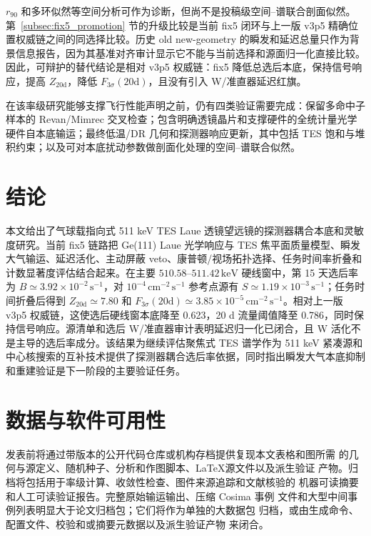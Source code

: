 \documentclass[preprint,12pt]{elsarticle}
\newcommand{\keV}{\,\mathrm{keV}}
\newcommand{\cms}{\,\mathrm{cm^{-2}\,s^{-1}}}
\newcommand{\cps}{\,\mathrm{s^{-1}}}
\newcommand{\fthree}{F_{3\sigma}}
\begin{document}
$r_{90}$ 和多环似然等空间分析可作为诊断，但尚不是投稿级空间--谱联合剖面似然。第~\ref{subsec:fix5_promotion} 节的升级比较是当前 fix5 闭环与上一版 v3p5 精确位置权威链之间的同选择比较。历史 old new-geometry 的瞬发和延迟总量只作为背景信息报告，因为其基准对齐审计显示它不能与当前选择和源面归一化直接比较。因此，可辩护的替代结论是相对 v3p5 权威链：fix5 降低总选后本底，保持信号响应，提高 $Z_{20\mathrm{d}}$，降低 $\fthree(20\mathrm{d})$，且没有引入 W/准直器延迟红旗。

在该率级研究能够支撑飞行性能声明之前，仍有四类验证需要完成：保留多命中子样本的 Revan/Mimrec 交叉检查；包含明确透镜晶片和支撑硬件的全统计量光学硬件自本底输运；最终低温/DR 几何和探测器响应更新，其中包括 TES 饱和与堆积约束；以及可对本底扰动参数做剖面化处理的空间--谱联合似然。

\section{结论}
\label{sec:conclusions}

本文给出了气球载指向式 511 keV TES Laue 透镜望远镜的探测器耦合本底和灵敏度研究。当前 fix5 链路把 Ge(111) Laue 光学响应与 TES 焦平面质量模型、瞬发大气输运、延迟活化、主动屏蔽 veto、康普顿/视场拓扑选择、任务时间率折叠和计数显著度评估结合起来。在主要 $510.58$--$511.42\keV$ 硬线窗中，第 15 天选后率为 $B\simeq3.92\times10^{-2}\cps$，对 $10^{-4}\cms$ 参考点源有 $S\simeq1.19\times10^{-3}\cps$；任务时间折叠后得到 $Z_{20\mathrm{d}}\simeq7.80$ 和 $\fthree(20\mathrm{d})\simeq3.85\times10^{-5}\cms$。相对上一版 v3p5 权威链，这使选后硬线窗本底降至 0.623，20 d 流量阈值降至 0.786，同时保持信号响应。源清单和选后 W/准直器审计表明延迟归一化已闭合，且 W 活化不是主导的选后率成分。该结果为继续评估聚焦式 TES 谱学作为 511 keV 紧凑源和中心核搜索的互补技术提供了探测器耦合选后率依据，同时指出瞬发大气本底抑制和重建验证是下一阶段的主要验证任务。

\section*{数据与软件可用性}
发表前将通过带版本的公开代码仓库或机构存档提供复现本文表格和图所需
的几何与源定义、随机种子、分析和作图脚本、\LaTeX 源文件以及派生验证
产物。归档将包括用于率级计算、收敛性检查、图件来源追踪和文献核验的
机器可读摘要和人工可读验证报告。完整原始输运输出、压缩 Cosima 事例
文件和大型中间事例列表明显大于论文归档包；它们将作为单独的大数据包
归档，或由生成命令、配置文件、校验和或摘要元数据以及派生验证产物
来闭合。
\end{document}
